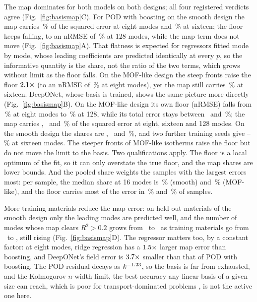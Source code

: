 \documentclass[10pt,a4paper]{article}
\begin{document}
The map dominates for both models on both designs; all four registered verdicts agree
(Fig.~\ref{fig:basismap}C). For POD with boosting on the smooth design the map carries
\nShHgbVtwoEight\,\% of the squared error at eight modes and \nShHgbVtwoSixteen\,\% at
sixteen; the floor keeps falling, to an nRMSE of \nHgbVtwoFloorHigh\,\% at 128 modes, while the map term does
not move (Fig.~\ref{fig:basismap}A). That flatness is expected for regressors fitted mode
by mode, whose leading coefficients are predicted identically at every \(p\), so the
informative quantity is the share, not the ratio of the two terms, which grows without
limit as the floor falls. On the MOF-like design the steep fronts raise the floor
\(2.1\times\) (to an nRMSE of \nHgbVthreeFloorEight\,\% at eight modes), yet the map still carries
\nShHgbVthreeSixteen\,\% at sixteen. DeepONet, whose basis is trained, shows the same picture
more directly (Fig.~\ref{fig:basismap}B). On the MOF-like design its own floor (nRMSE) falls from
\nDonVthreeFloorEight\,\% at eight modes to \nDonVthreeFloorHigh\,\% at 128, while its total
error stays between \nDonVthreeTotalSixteen\ and \nDonVthreeTotalEight\,\%; the map carries
\nShDonVthreeEight, \nShDonVthreeSixteen\ and \nShDonVthreeHigh\,\% of the squared error at
eight, sixteen and 128 modes. On the smooth design the shares are \nShDonVtwoEight,
\nShDonVtwoSixteen\ and \nShDonVtwoHigh\,\%, and two further training seeds give
\nShDonSeedMin--\nShDonSeedMax\,\% at sixteen modes. The steeper fronts of MOF-like
isotherms raise the floor but do not move the limit to the basis. Two qualifications apply.
The floor is a local optimum of the fit, so it can only overstate the true floor, and the
map shares are lower bounds. And the pooled share weights the samples with the largest
errors most: per sample, the median share at 16 modes is \nPerSampleMedVtwo\,\%
(smooth) and \nPerSampleMedVthree\,\% (MOF-like), and the floor carries most of the error in
\nFloorDomVtwo\,\% and \nFloorDomVthree\,\% of samples.

More training materials reduce the map error: on held-out materials of the smooth design
only the leading modes are predicted well, and the number of modes whose map clears
\(R^2 > 0.2\) grows from \nLCmodesSmall\ to \nLCmodesLarge\ as training materials go from \nLCsizeMin\
to \nLCsizeMax, still rising (Fig.~\ref{fig:basismap}D). The regressor matters too, by a constant
factor: at eight modes, ridge regression has a \(1.5\times\) larger map error than boosting, and
DeepONet's field error is \(3.7\times\) smaller than that of POD with boosting.
The POD residual decays as \(k^{-1.23}\), so the basis is far from exhausted, and
the Kolmogorov \(n\)-width limit, the best accuracy any linear basis of a given size can
reach, which is poor for transport-dominated problems \cite{lanthaler2023nonlinear}, is not
the active one here.
\end{document}

